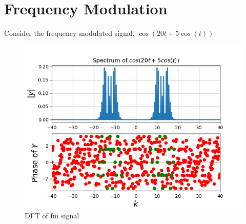 \documentclass[11pt, a4paper]{article}
\begin{document}
\newpage
\section{Frequency Modulation}
Consider the frequency modulated signal, $\cos(20t + 5\cos(t))$
\begin{figure}[!tbh]
   	\centering
   	\includegraphics[scale=0.5]{fig4.png}  %
   	\caption{DFT of fm signal}
   	\label{fig:sample}
   \end{figure} 
   
   
\newpage
\end{document}
